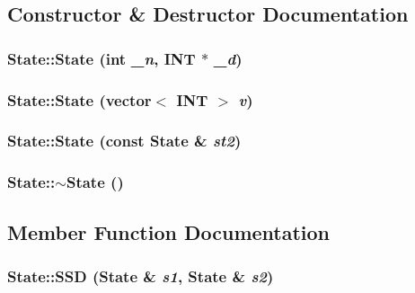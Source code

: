 \subsection{Constructor \& Destructor Documentation}
\subsubsection{\setlength{\rightskip}{0pt plus 5cm}State::State (int {\em \_\-n}, {\bf INT} $\ast$ {\em \_\-d})\hspace{0.3cm}{\tt  [inline]}}\label{classState_0ef5c563f639f788f24afbc7f0f37288}


\subsubsection{\setlength{\rightskip}{0pt plus 5cm}State::State (vector$<$ {\bf INT} $>$ {\em v})\hspace{0.3cm}{\tt  [inline]}}\label{classState_c4fc0df913015a99774456669f2bdaa1}


\subsubsection{\setlength{\rightskip}{0pt plus 5cm}State::State (const {\bf State} \& {\em st2})\hspace{0.3cm}{\tt  [inline]}}\label{classState_0261bbf902290f544599c70e2951a80c}


\subsubsection{\setlength{\rightskip}{0pt plus 5cm}State::$\sim$State ()\hspace{0.3cm}{\tt  [inline]}}\label{classState_4996784dd93206fc1cb99ca51c4725dd}




\subsection{Member Function Documentation}
\subsubsection{ State::SSD ({\bf State} \& {\em s1}, {\bf State} \& {\em s2})\hspace{0.3cm}{\tt  [static]}}\label{classState_ee08b1dc453489f8482702edb8300a75}


